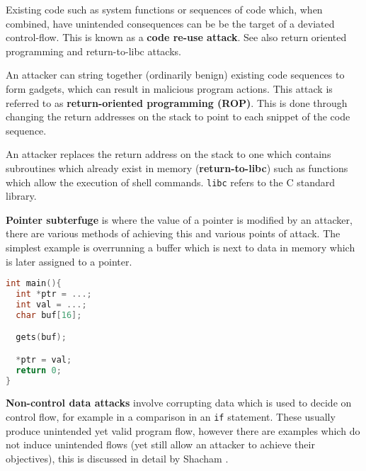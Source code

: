 Existing code such as system functions or sequences of code which, when combined, have unintended consequences can be be the target of a deviated control-flow. This is known as a \textbf{code re-use attack}. See also return oriented programming and return-to-libc attacks.


An attacker can string together (ordinarily benign) existing code sequences to form gadgets, which can result in malicious program actions. This attack is referred to as \textbf{return-oriented programming (ROP)}. This is done through changing the return addresses on the stack to point to each snippet of the code sequence.

An attacker replaces the return address on the stack to one which contains subroutines which already exist in memory (\textbf{return-to-libc}) such as functions which allow the execution of shell commands. \verb|libc| refers to the C standard library.

\textbf{Pointer subterfuge} is where the value of a pointer is modified by an attacker, there are various methods of achieving this and various points of attack. The simplest example is overrunning a buffer which is next to data in memory which is later assigned to a pointer.
\begin{lstlisting}[language={C},caption={An example of code which is vulnerable to pointer subterfuge \cite{Wang2016a}},label={lst:pointerSubterfuge}]
int main(){
  int *ptr = ...;
  int val = ...;
  char buf[16];

  gets(buf);

  *ptr = val;
  return 0;
}
\end{lstlisting}


\textbf{Non-control data attacks} involve corrupting data which is used to decide on control flow, for example in a comparison in an \verb|if| statement. These usually produce unintended yet valid program flow, however there are examples which do not induce unintended flows (yet still allow an attacker to achieve their objectives), this is discussed in detail by Shacham \cite{Shacham2007}.